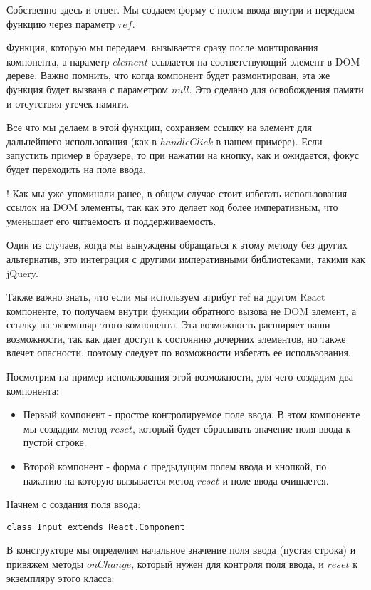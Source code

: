 Собственно здесь и ответ. Мы создаем форму с полем ввода внутри и передаем функцию через параметр $ref$.

Функция, которую мы передаем, вызывается сразу после монтирования компонента, а параметр $element$ ссылается на соответствующий элемент в DOM дереве. Важно помнить, что когда компонент будет размонтирован, эта же функция будет вызвана с параметром $null$. Это сделано для освобождения памяти и отсутствия утечек памяти. 

Все что мы делаем в этой функции, сохраняем ссылку на элемент для дальнейшего использования (как в $handleClick$ в нашем примере). Если запустить пример в браузере, то при нажатии на кнопку, как и ожидается, фокус будет переходить на поле ввода.

! Как мы уже упоминали ранее, в общем случае стоит избегать использования ссылок на DOM элементы, так как это делает код более императивным, что уменьшает его читаемость и поддерживаемость.

Один из случаев, когда мы вынуждены обращаться к этому методу без других альтернатив, это интеграция с другими императивными библиотеками, такими как jQuery.

Также важно знать, что если мы используем атрибут ref на другом React компоненте, то получаем внутри функции обратного вызова не DOM элемент, а ссылку на экземпляр этого компонента. Эта возможность расширяет наши возможности, так как дает доступ к состоянию дочерних элементов, но также влечет опасности, поэтому следует по возможности избегать ее использования.

Посмотрим на пример использования этой возможности, для чего создадим два компонента:

\begin{itemize}
	\item Первый компонент - простое контролируемое поле ввода. В этом компоненте мы создадим метод $reset$, который будет сбрасывать значение поля ввода к пустой строке.
	\item Второй компонент - форма с предыдущим полем ввода и кнопкой, по нажатию на которую вызывается метод $reset$ и поле ввода очищается.
\end{itemize}

Начнем с создания поля ввода:

\begin{lstlisting}
class Input extends React.Component
\end{lstlisting}

В конструкторе мы определим начальное значение поля ввода (пустая строка) и привяжем методы $onChange$, который нужен для контроля поля ввода, и $reset$ к экземпляру этого класса:

